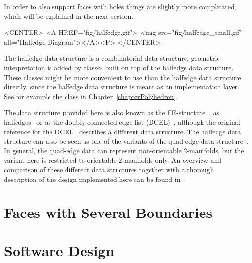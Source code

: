 In order to also support faces with holes things are slightly more
complicated, which will be explained in the next section.


\begin{ccHtmlOnly}
    <CENTER>
    <A HREF="fig/halfedge.gif">
        <img src="fig/halfedge_small.gif" alt="Halfedge Diagram"></A><P>
    </CENTER>
\end{ccHtmlOnly}

The halfedge data structure is a combinatorial data structure,
geometric interpretation is added by classes built on top of the
halfedge data structure.  These classes might be more convenient to
use than the halfedge data structure directly, since the halfedge data
structure is meant as an implementation layer.  See for example the
 class in Chapter~\ref{chapterPolyhedron}.

The data structure provided here is also known as the
FE-structure~\cite{w-ebdss-85}, as
halfedges~\cite{m-ism-88,cgal:bfh-mgedm-95} or as the doubly connected edge
list (DCEL)~\cite{bkos-cgaa-97}, although the original reference for
the DCEL~\cite{mp-fitcp-78} describes a different data structure. The
halfedge data structure can also be seen as one of the variants of the
quad-edge data structure~\cite{gs-pmgsc-85}. In general, the quad-edge
data can represent non-orientable 2-manifolds, but the variant here is
restricted to orientable 2-manifolds only. An overview and comparison
of these different data structures together with a thorough
description of the design implemented here can be found
in~\cite{k-ugpdd-99}.  

\section{Faces with Several Boundaries}



\section{Software Design}


